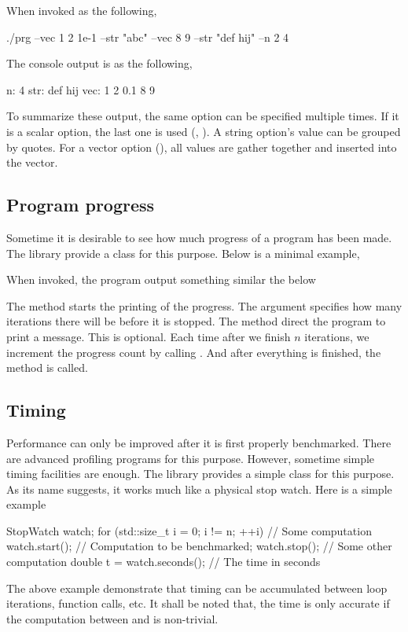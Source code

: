 When invoked as the following,
\begin{consolecode}
  ./prg --vec 1 2 1e-1 --str "abc" --vec 8 9 --str "def hij" --n 2 4
\end{consolecode}
The console output is as the following,
\begin{consolecode}
  n: 4
  str: def hij
  vec: 1 2 0.1 8 9
\end{consolecode}
To summarize these output, the same option can be specified multiple times. If
it is a scalar option, the last one is used (, ).
A string option's value can be grouped by quotes. For a vector option
(), all values are gather together and inserted into the
vector.

\subsection{Program progress}
\label{sub:Program progress}

Sometime it is desirable to see how much progress of a program has been made.
The library provide a  class for this purpose. Below is a
minimal example,

When invoked, the program output something similar the below
The method  starts the printing of the
progress. The argument specifies how many iterations there will be before it is
stopped. The method  direct the program
to print a message. This is optional. Each time after we finish $n$ iterations,
we increment the progress count by calling .
And after everything is finished, the method  is
called.

\subsection{Timing}
\label{sub:Timing}

Performance can only be improved after it is first properly benchmarked. There
are advanced profiling programs for this purpose. However, sometime simple
timing facilities are enough. The library provides a simple class
 for this purpose. As its name suggests, it works much
like a physical stop watch. Here is a simple example
\begin{cppcode}
  StopWatch watch;
  for (std::size_t i = 0; i != n; ++i) {
    // Some computation
    watch.start();
    // Computation to be benchmarked;
    watch.stop();
    // Some other computation
  }
  double t = watch.seconds(); // The time in seconds
\end{cppcode}
The above example demonstrate that timing can be accumulated between loop
iterations, function calls, etc. It shall be noted that, the time is only
accurate if the computation between  and
 is non-trivial.

\printbibliography[title=\refname]
